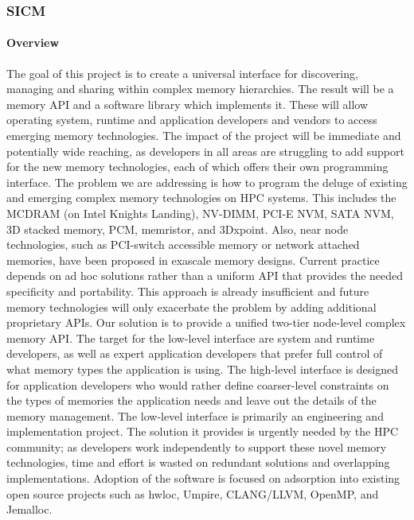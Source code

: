 \subsubsection{ SICM}
\paragraph{Overview} The goal of this project is to create a universal interface for discovering, managing and sharing within complex memory hierarchies. The result will be a memory API and a software library which implements it. These will allow operating system, runtime and application developers and vendors to access emerging memory technologies. The impact of the project will be immediate and potentially wide reaching, as developers in all areas are struggling to add support for the new memory technologies, each of which offers their own programming interface. The problem we are addressing is how to program the deluge of existing and emerging complex memory technologies on HPC systems. This includes the MCDRAM (on Intel Knights Landing), NV-DIMM, PCI-E NVM, SATA NVM, 3D stacked memory, PCM, memristor, and 3Dxpoint. Also, near node technologies, such as PCI-switch accessible memory or network attached memories, have been proposed in exascale memory designs. Current practice depends on ad hoc solutions rather than a uniform API that provides the needed specificity and portability. This approach is already insufficient and future memory technologies will only exacerbate the problem by adding additional proprietary APIs. Our solution is to provide a unified two-tier node-level complex memory API. The target for the low-level interface are system and runtime developers, as well as expert application developers that prefer full control of what memory types the application is using. The high-level interface is designed for application developers who would rather define coarser-level constraints on the types of memories the application needs and leave out the details of the memory management. The low-level interface is primarily an engineering and implementation project. The solution it provides is urgently needed by the HPC community; as developers work independently to support these novel memory technologies, time and effort is wasted on redundant solutions and overlapping implementations. Adoption of the software is focused on adsorption into existing open source projects such as hwloc, Umpire, CLANG/LLVM, OpenMP, and Jemalloc.

